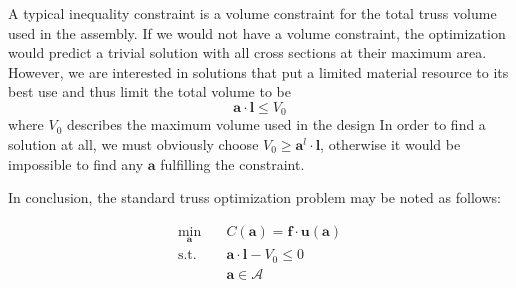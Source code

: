 A typical inequality constraint is a volume constraint for the total truss volume used in the assembly. If we would not have a volume constraint, the optimization would predict a trivial solution with all cross sections at their maximum area. However, we are interested in solutions that put a limited material resource to its best use and thus limit the total volume to be 
\begin{equation}
    \mathbf{a} \cdot \mathbf{l} \le V_0
\end{equation}
where $V_0$ describes the maximum volume used in the design
In order to find a solution at all, we must obviously choose $V_0 \ge \mathbf{a}^l \cdot \mathbf{l}$, otherwise it would be impossible to find any $\mathbf{a}$ fulfilling the constraint. 

In conclusion, the standard truss optimization problem may be noted as follows:

\begin{equation}
    \begin{aligned}
        \min_{\mathbf{a}} \quad & C(\mathbf{a}) = \mathbf{f} \cdot \mathbf{u}(\mathbf{a})\\
        \textrm{s.t.} \quad & \mathbf{a} \cdot \mathbf{l} - V_0 \le 0  \\
                            & \mathbf{a} \in \mathcal{A}\\
    \end{aligned}
    \label{eq:size_optimization}
\end{equation}

